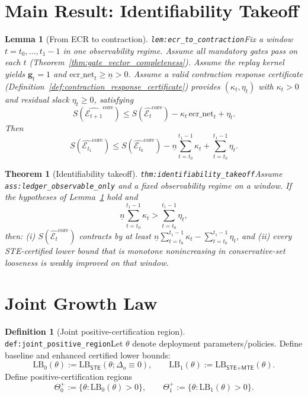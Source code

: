 \documentclass[11pt]{article}
\theoremstyle{definition}
\newtheorem{definition}{Definition}
\theoremstyle{plain}
\newtheorem{lemma}{Lemma}
\newtheorem{theorem}{Theorem}
\newcommand{\STE}{\textsf{STE}}
\newcommand{\MTE}{\textsf{MTE}}
\newcommand{\lbl}[1]{\texttt{\footnotesize\nolinkurl{#1}}}
\newcommand{\DefLabel}[1]{\hfill{\small\lbl{#1}}}
\newcommand{\deltao}{\Delta_o}
\begin{document}
\section{Main Result: Identifiability Takeoff}\label{sec:main}
\begin{lemma}[From ECR to contraction]\DefLabel{lem:ecr_to_contraction}\label{lem:ecr_to_contraction}
Fix a window $t=t_0,\dots,t_1-1$ in one observability regime.
Assume all mandatory gates pass on each $t$ (Theorem~\ref{thm:gate_vector_completeness}).
Assume the replay kernel yields $\mathbf{g}_t=1$ and $\mathrm{ecr\_net}_t\ge \underline{n}>0$.
Assume a valid contraction response certificate (Definition~\ref{def:contraction_response_certificate}) provides $(\kappa_t,\eta_t)$ with $\kappa_t>0$ and residual slack $\eta_t\ge 0$, satisfying
\[
S\!\left(\widehat{\mathcal{E}_{t+1}}^{\mathrm{core}}\right)\le S\!\left(\widehat{\mathcal{E}_{t}}^{\mathrm{core}}\right)-\kappa_t\,\mathrm{ecr\_net}_t+\eta_t.
\]
Then
\[
S\!\left(\widehat{\mathcal{E}_{t_1}}^{\mathrm{core}}\right)\le S\!\left(\widehat{\mathcal{E}_{t_0}}^{\mathrm{core}}\right)-\underline{n}\sum_{t=t_0}^{t_1-1}\kappa_t+\sum_{t=t_0}^{t_1-1}\eta_t.
\]
\end{lemma}

\begin{theorem}[Identifiability takeoff]\DefLabel{thm:identifiability_takeoff}\label{thm:identifiability_takeoff}
Assume \lbl{ass:ledger_observable_only} and a fixed observability regime on a window.
If the hypotheses of Lemma~\ref{lem:ecr_to_contraction} hold and
\[
\underline{n}\sum_{t=t_0}^{t_1-1}\kappa_t>\sum_{t=t_0}^{t_1-1}\eta_t,
\]
then:
(i) $S(\widehat{\mathcal{E}_{t}}^{\mathrm{core}})$ contracts by at least $\underline{n}\sum_{t=t_0}^{t_1-1}\kappa_t-\sum_{t=t_0}^{t_1-1}\eta_t$, and
(ii) every \STE{}-certified lower bound that is monotone nonincreasing in conservative-set looseness is weakly improved on that window.
\end{theorem}

\section{Joint Growth Law}\label{sec:joint}
\begin{definition}[Joint positive-certification region]\DefLabel{def:joint_positive_region}\label{def:joint_positive_region}
Let $\theta$ denote deployment parameters/policies.
Define baseline and enhanced certified lower bounds:
\[
\mathrm{LB}_0(\theta):=\mathrm{LB}_{\STE}(\theta;\deltao\equiv 0),\qquad
\mathrm{LB}_1(\theta):=\mathrm{LB}_{\STE+\MTE}(\theta).
\]
Define positive-certification regions
\[
\Theta_0^{+}:=\{\theta:\mathrm{LB}_0(\theta)>0\},\qquad
\Theta_1^{+}:=\{\theta:\mathrm{LB}_1(\theta)>0\}.
\]
\end{definition}
\end{document}
